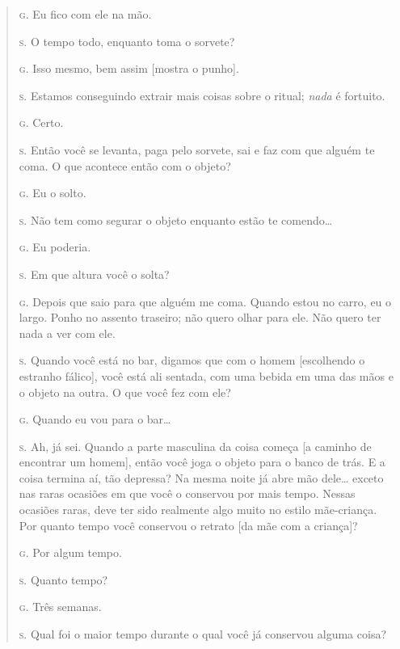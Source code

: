 \begin{quote}
\noindent\hskip0mm\textsc{g.} Eu fico com ele na mão.

\noindent\hskip0mm\textsc{s.} O tempo todo, enquanto toma o sorvete?

\noindent\hskip0mm\textsc{g.} Isso mesmo, bem assim [mostra o punho].

\noindent\hskip0mm\textsc{s.} Estamos conseguindo extrair mais coisas sobre o ritual; \textit{nada}
é fortuito.

\noindent\hskip0mm\textsc{g.} Certo.

\noindent\hskip0mm\textsc{s.} Então você se levanta, paga pelo sorvete, sai e faz com que alguém te
coma. O que acontece então com o objeto?

\noindent\hskip0mm\textsc{g.} Eu o solto.

\noindent\hskip0mm\textsc{s.} Não tem como segurar o objeto enquanto estão te comendo\ldots{}

\noindent\hskip0mm\textsc{g.} Eu poderia.

\noindent\hskip0mm\textsc{s.} Em que altura você o solta?

\noindent\hskip0mm\textsc{g.} Depois que saio para que alguém me coma. Quando estou no carro, eu o
largo. Ponho no assento traseiro; não quero olhar para ele. Não quero
ter nada a ver com ele.

\noindent\hskip0mm\textsc{s.} Quando você está no bar, digamos que com o homem [escolhendo o
estranho fálico], você está ali sentada, com uma bebida em uma das mãos
e o objeto na outra. O que você fez com ele?

\noindent\hskip0mm\textsc{g.} Quando eu vou para o bar\ldots{}

\noindent\hskip0mm\textsc{s.} Ah, já sei. Quando a parte masculina da coisa começa [a caminho de
encontrar um homem], então você joga o objeto para o banco de trás. E
a coisa termina aí, tão depressa? Na mesma noite já abre mão dele\ldots{}
exceto nas raras ocasiões em que você o conservou por mais tempo.
Nessas ocasiões raras, deve ter sido realmente algo muito no estilo
mãe-criança. Por quanto tempo você conservou o retrato [da mãe com a
criança]?

\noindent\hskip0mm\textsc{g.} Por algum tempo.

\noindent\hskip0mm\textsc{s.} Quanto tempo?

\noindent\hskip0mm\textsc{g.} Três semanas.

\noindent\hskip0mm\textsc{s.} Qual foi o maior tempo durante o qual você já conservou alguma coisa?


\end{quote}
